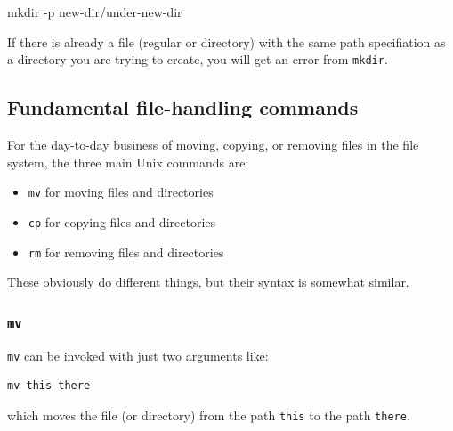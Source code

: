 \documentclass[]{krantz}
\makeatletter
\newenvironment{Shaded}{\begin{snugshade}}{\end{snugshade}}
\newcommand{\FunctionTok}[1]{\textcolor[rgb]{0,0,0}{#1}}
\newcommand{\NormalTok}[1]{#1}
\providecommand{\tightlist}{%
  \setlength{\itemsep}{0pt}\setlength{\parskip}{0pt}}
\newenvironment{kframe}{%
\medskip{}
\setlength{\fboxsep}{.8em}
 \def\at@end@of@kframe{}%
 \ifinner\ifhmode%
  \def\at@end@of@kframe{\end{minipage}}%
  \begin{minipage}{\columnwidth}%
 \fi\fi%
 \def\FrameCommand##1{\hskip\@totalleftmargin \hskip-\fboxsep
 \colorbox{shadecolor}{##1}\hskip-\fboxsep
     \hskip-\linewidth \hskip-\@totalleftmargin \hskip\columnwidth}%
 \MakeFramed {\advance\hsize-\width
   \@totalleftmargin\z@ \linewidth\hsize
   \@setminipage}}%
 {\par\unskip\endMakeFramed%
 \at@end@of@kframe}
\renewenvironment{Shaded}{\begin{kframe}}{\end{kframe}}
\makeatother
\begin{document}
\begin{Shaded}
\begin{Highlighting}[]
\FunctionTok{mkdir}\NormalTok{ -p new-dir/under-new-dir}
\end{Highlighting}
\end{Shaded}

If there is already a file (regular or directory) with the same path specifiation as a directory you are
trying to create, you will get an error from \texttt{mkdir}.

\hypertarget{fundamental-file-handling-commands}{%
\subsection{Fundamental file-handling commands}\label{fundamental-file-handling-commands}}

For the day-to-day business of moving, copying, or removing files in the file system,
the three main Unix commands are:

\begin{itemize}
\tightlist
\item
  \texttt{mv} for moving files and directories
\item
  \texttt{cp} for copying files and directories
\item
  \texttt{rm} for removing files and directories
\end{itemize}

These obviously do different things, but their syntax is somewhat similar.

\hypertarget{mv}{%
\subsubsection{\texorpdfstring{\texttt{mv}}{mv}}\label{mv}}

\texttt{mv} can be invoked with just two arguments like:

\begin{verbatim}
mv this there
\end{verbatim}

which moves the file (or directory) from the path \texttt{this} to the path \texttt{there}.
\end{document}
